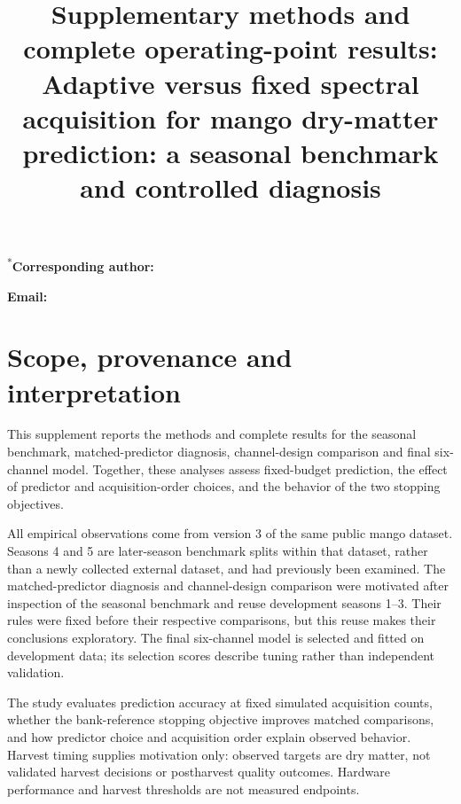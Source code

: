 \documentclass[10pt,a4paper]{article}
\begin{document}
\title{Supplementary methods and complete operating-point results:\\Adaptive versus fixed spectral acquisition for mango dry-matter prediction: a seasonal benchmark and controlled diagnosis}
\author{\parbox{\dimexpr\textwidth-2\tabcolsep\relax}{\centering\AuthorNames}}
\date{}
\maketitle
{\small\AuthorAffiliations\par}
\medskip
{\small\textsuperscript{*}\textbf{Corresponding author:} \CorrespondingAuthor\par
\textbf{Email:} \href{mailto:\CorrespondingEmail}{\CorrespondingEmail}\par}
{\small\setlength{\parskip}{0pt}\tableofcontents}
\clearpage
\section{Scope, provenance and interpretation}
This supplement reports the methods and complete results for the seasonal benchmark, matched-predictor diagnosis, channel-design comparison and final six-channel model. Together, these analyses assess fixed-budget prediction, the effect of predictor and acquisition-order choices, and the behavior of the two stopping objectives.

All empirical observations come from version 3 of the same public mango dataset.\citep{andersondata2024} Seasons 4 and 5 are later-season benchmark splits within that dataset, rather than a newly collected external dataset, and had previously been examined. The matched-predictor diagnosis and channel-design comparison were motivated after inspection of the seasonal benchmark and reuse development seasons 1--3. Their rules were fixed before their respective comparisons, but this reuse makes their conclusions exploratory. The final six-channel model is selected and fitted on development data; its selection scores describe tuning rather than independent validation.

The study evaluates prediction accuracy at fixed simulated acquisition counts, whether the bank-reference stopping objective improves matched comparisons, and how predictor choice and acquisition order explain observed behavior. Harvest timing supplies motivation only: observed targets are dry matter, not validated harvest decisions or postharvest quality outcomes. Hardware performance and harvest thresholds are not measured endpoints.
\end{document}
